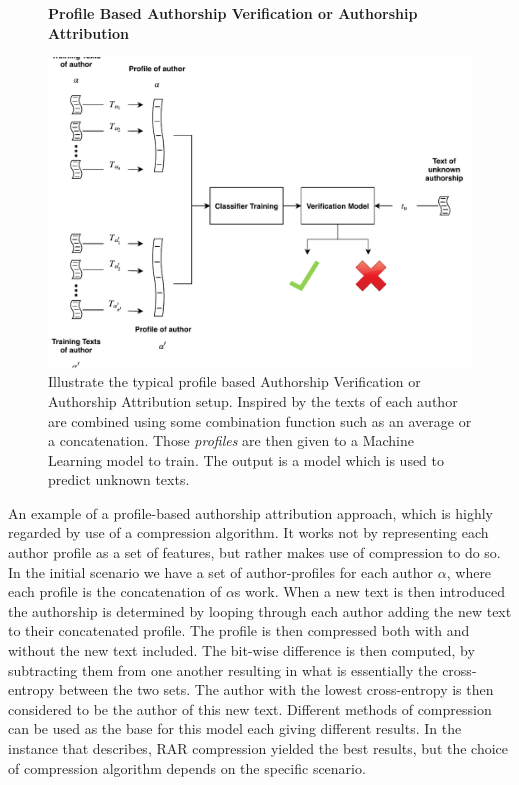 \begin{figure}[htb]
    \centering
    \textbf{Profile Based Authorship Verification or Authorship Attribution}\par\medskip
    \includegraphics[scale=0.5]{./pictures/method/profile_based}
    \caption{Illustrate the typical profile based Authorship Verification or
        Authorship Attribution setup. Inspired by \citet{stamatos2009} the texts
        of each author are combined using some combination function such as an
        average or a concatenation. Those \textit{profiles} are then given to a
        Machine Learning model to train. The output is a model which is used to
        predict unknown texts.}
    \label{fig:profile_based}
\end{figure}

\noindent An example of a profile-based authorship attribution approach, which
is highly regarded by \citet{stamatos2009} use of a compression algorithm.
It works not by representing each author profile as a set of features, but
rather makes use of compression to do so. In the initial scenario we have
a set of author-profiles for each author $\alpha$, where each profile is
the concatenation of $\alpha$s work. When a new text is then introduced the
authorship is determined by looping through each author adding the new text to
their concatenated profile. The profile is then compressed both with and without
the new text included. The bit-wise difference is then computed, by subtracting
them from one another resulting in what is essentially the cross-entropy between
the two sets. The author with the lowest cross-entropy is then considered to
be the author of this new text. Different methods of compression can be used
as the base for this model each giving different results. In the instance that
\citet{stamatos2009} describes, RAR compression yielded the best results, but
the choice of compression algorithm depends on the specific scenario.

